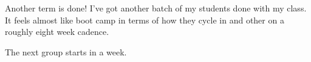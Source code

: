 Another term is done! I've got another batch of my students done with my
class. It feels almost like boot camp in terms of how they cycle in and
other on a roughly eight week cadence.

The next group starts in a week.
